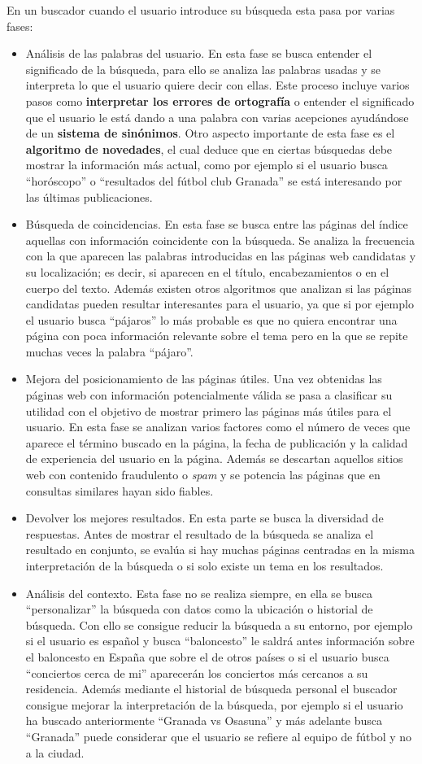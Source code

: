 \documentclass[size=a4, parskip=half, titlepage=false, toc=flat, toc=bib, 12pt]{scrartcl}
\theoremstyle{theorem-style}
\theoremstyle{definition-style}
\theoremstyle{remark-style}
\theoremstyle{example-style}
\theoremstyle{definition-style}
\theoremstyle{remark-style}
\begin{document}
En un buscador cuando el usuario introduce su búsqueda esta pasa por varias fases:
\begin{itemize}
\item Análisis de las palabras del usuario. En esta fase se busca entender el significado de la búsqueda, para ello se analiza las palabras usadas y se interpreta lo que el usuario quiere decir con ellas. Este proceso incluye varios pasos como \textbf{interpretar los errores de ortografía} o entender el significado que el usuario le está dando a una palabra con varias acepciones ayudándose de un \textbf{sistema de sinónimos}. Otro aspecto importante de esta fase es el \textbf{algoritmo de novedades}, el cual deduce que en ciertas búsquedas debe mostrar la información más actual, como por ejemplo si el usuario busca ``horóscopo'' o ``resultados del fútbol club Granada'' se está interesando por las últimas publicaciones.
\item Búsqueda de coincidencias. En esta fase se busca entre las páginas del índice aquellas con información coincidente con la búsqueda. Se analiza la frecuencia con la que aparecen las palabras introducidas en las páginas web candidatas y su localización; es decir, si aparecen en el título, encabezamientos o en el cuerpo del texto. Además existen otros algoritmos que analizan si las páginas candidatas pueden resultar interesantes para el usuario, ya que si por ejemplo el usuario busca ``pájaros'' lo más probable es que no quiera encontrar una página con poca información relevante sobre el tema pero en la que se repite muchas veces la palabra ``pájaro''.
\item Mejora del posicionamiento de las páginas útiles. Una vez obtenidas las páginas web con información potencialmente válida se pasa a clasificar su utilidad con el objetivo de mostrar primero las páginas más útiles para el usuario. En esta fase se analizan varios factores como el número de veces que aparece el término buscado en la página, la fecha de publicación y la calidad de experiencia del usuario en la página. Además se descartan aquellos sitios web con contenido fraudulento o \textit{spam} y se potencia las páginas que en consultas similares hayan sido fiables.
\item Devolver los mejores resultados. En esta parte se busca la diversidad de respuestas. Antes de mostrar el resultado de la búsqueda se analiza el resultado en conjunto, se evalúa si hay muchas páginas centradas en la misma interpretación de la búsqueda o si solo existe un tema en los resultados.
\item Análisis del contexto. Esta fase no se realiza siempre, en ella se busca ``personalizar'' la búsqueda con datos como la ubicación o historial de búsqueda. Con ello se consigue reducir la búsqueda a su entorno, por ejemplo si el usuario es español y busca ``baloncesto'' le saldrá antes información sobre el baloncesto en España que sobre el de otros países o si el usuario busca ``conciertos cerca de mi'' aparecerán los conciertos más cercanos a su residencia. Además mediante el historial de búsqueda personal el buscador consigue mejorar la interpretación de la búsqueda, por ejemplo si el usuario ha buscado anteriormente ``Granada vs Osasuna'' y más adelante busca ``Granada'' puede considerar que el usuario se refiere al equipo de fútbol y no a la ciudad.

\end{itemize}
\end{document}
